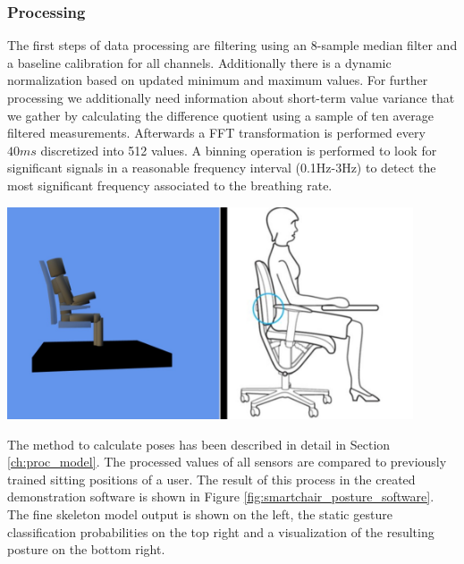 \subsubsection{Processing}
The first steps of data processing are filtering using an 8-sample median filter and a baseline calibration for all channels. Additionally there is a dynamic normalization based on updated minimum and maximum values. For further processing we additionally need information about short-term value variance that we gather by calculating the difference quotient using a sample of ten average filtered measurements. Afterwards a FFT transformation is performed every $40ms$ discretized into 512 values. A binning operation is performed to look for significant signals in a reasonable frequency interval (0.1Hz-3Hz) to detect the most significant frequency associated to the breathing rate. 

\begin{minipage}{\linewidth}
\centering
\includegraphics[width=0.9\textwidth]{images/smartchair_posture_software}
\label{fig:smartchair_posture_software}
\end{minipage}

The method to calculate poses has been described in detail in Section \ref{ch:proc_model}. The processed values of all sensors are compared to previously trained sitting positions of a user. The result of this process in the created demonstration software is shown in Figure \ref{fig:smartchair_posture_software}. The fine skeleton model output is shown on the left, the static gesture classification probabilities on the top right and a visualization of the resulting posture on the bottom right.

